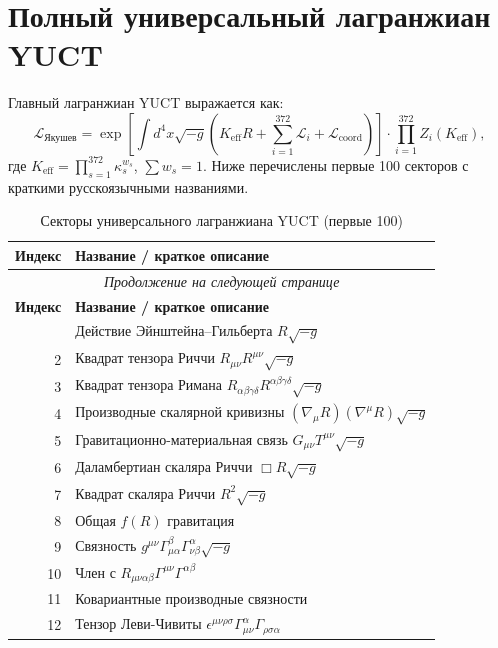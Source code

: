 \documentclass[12pt,a4paper]{article}
\begin{document}
	\section{Полный универсальный лагранжиан YUCT}
	Главный лагранжиан YUCT выражается как:
	\begin{equation}
		\mathcal{L}_{\text{Якушев}} = \exp\left[\int d^4x\sqrt{-g}\left(K_{\mathrm{eff}}R + \sum_{i=1}^{372}\mathcal{L}_i + \mathcal{L}_{\text{coord}}\right)\right] \cdot \prod_{i=1}^{372} Z_i(K_{\mathrm{eff}}),
	\end{equation}
	где \(K_{\mathrm{eff}} = \prod_{s=1}^{372} \kappa_s^{w_s}\), \(\sum w_s = 1\). Ниже перечислены первые 100 секторов с краткими русскоязычными названиями.
	\scriptsize
	\begin{longtable}{r l}
		\caption{Секторы универсального лагранжиана YUCT (первые 100)}\label{tab:sectors}\\
		\toprule
		\textbf{Индекс} & \textbf{Название / краткое описание} \\
		\midrule
		\endfirsthead
		\multicolumn{2}{c}{\textit{Продолжение на следующей странице}}\\
		\toprule
		\textbf{Индекс} & \textbf{Название / краткое описание} \\
		\midrule
		\endhead
		\bottomrule
		\endfoot
		1 & Действие Эйнштейна--Гильберта \(R\sqrt{-g}\) \\
		2 & Квадрат тензора Риччи \(R_{\mu\nu}R^{\mu\nu}\sqrt{-g}\) \\
		3 & Квадрат тензора Римана \(R_{\alpha\beta\gamma\delta}R^{\alpha\beta\gamma\delta}\sqrt{-g}\) \\
		4 & Производные скалярной кривизны \((\nabla_\mu R)(\nabla^\mu R)\sqrt{-g}\) \\
		5 & Гравитационно-материальная связь \(G_{\mu\nu}T^{\mu\nu}\sqrt{-g}\) \\
		6 & Даламбертиан скаляра Риччи \(\Box R\sqrt{-g}\) \\
		7 & Квадрат скаляра Риччи \(R^2\sqrt{-g}\) \\
		8 & Общая \(f(R)\) гравитация \\
		9 & Связность \(g^{\mu\nu}\Gamma^{\beta}_{\mu\alpha}\Gamma^{\alpha}_{\nu\beta}\sqrt{-g}\) \\
		10 & Член с \(R_{\mu\nu\alpha\beta}\Gamma^{\mu\nu}\Gamma^{\alpha\beta}\) \\
		11 & Ковариантные производные связности \\
		12 & Тензор Леви-Чивиты \(\epsilon^{\mu\nu\rho\sigma}\Gamma^{\alpha}_{\mu\nu}\Gamma_{\rho\sigma\alpha}\) \\

\end{longtable}
\end{document}

